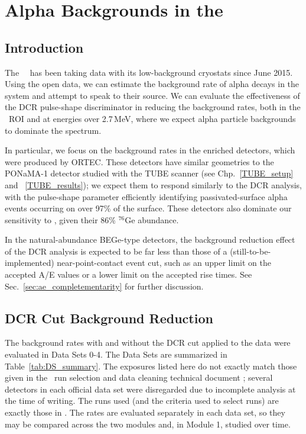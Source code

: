
 
 
\chapter{Alpha Backgrounds in the \MJ\ \DEM\ }\label{ch:MJ_rates}

\section{Introduction}
The \MJ\ \DEM\ has been taking data with its low-background cryostats since June 2015. Using the open data, we can estimate the background rate of alpha decays in the system and attempt to speak to their source. We can evaluate the effectiveness of the DCR pulse-shape discriminator in reducing the background rates, both in the \nonubb\ ROI and at energies over 2.7\,MeV, where we expect alpha particle backgrounds to dominate the spectrum. 

In particular, we focus on the background rates in the enriched detectors, which were produced by ORTEC. These detectors have similar geometries to the PONaMA-1 detector studied with the TUBE scanner (see Chp.~\ref{TUBE_setup} and ~\ref{TUBE_results}); we expect them to respond similarly to the DCR analysis, with the pulse-shape parameter efficiently identifying passivated-surface alpha events occurring on over 97\% of the surface. These detectors also dominate our sensitivity to \nonubb , given their 86\% $^{76}$Ge abundance. 

In the natural-abundance BEGe-type detectors, the background reduction effect of the DCR analysis is expected to be far less than those of a (still-to-be-implemented) near-point-contact event cut, such as an upper limit on the accepted A/E values or a lower limit on the accepted rise times. See Sec.~\ref{sec:ae_completementarity} for further discussion. 

\section{DCR Cut Background Reduction}
The background rates with and without the DCR cut applied to the data were evaluated in Data Sets 0-4. The Data Sets are summarized in Table~\ref{tab:DS_summary}. The exposures listed here do not exactly match those given in the \MJ\ run selection and data cleaning technical document \cite{MJ_runSel}; several detectors in each official data set were disregarded due to incomplete analysis at the time of writing. The runs used (and the criteria used to select runs) are exactly those in \cite{MJ_runSel}. The rates are evaluated separately in each data set, so they may be compared across the two modules and, in Module 1, studied over time. 

